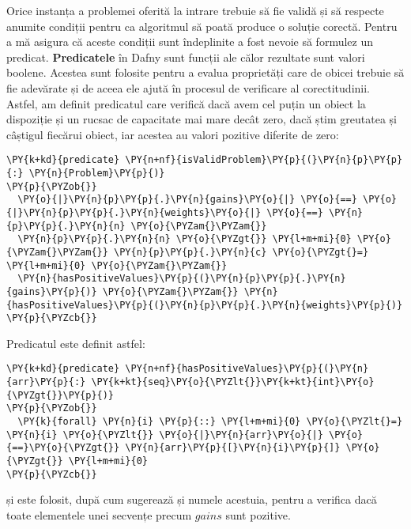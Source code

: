\begin{sloppypar}
Orice instanța a problemei oferită la intrare trebuie să fie validă și să respecte anumite condiții pentru ca algoritmul să poată produce o soluție corectă. Pentru a mă asigura că aceste condiții sunt îndeplinite a fost nevoie să formulez un predicat. \textbf{Predicatele} în Dafny sunt funcții ale călor rezultate sunt valori boolene. Acestea sunt folosite pentru a evalua proprietăți care de obicei trebuie să fie adevărate și de aceea ele ajută în procesul de verificare al corectitudinii. Astfel, am definit predicatul  care verifică dacă avem cel puțin un obiect la dispoziție și un rucsac de capacitate mai mare decât zero, dacă știm greutatea și câștigul fiecărui obiect, iar acestea au valori pozitive diferite de zero:
    \begin{Verbatim}[commandchars=\\\{\}]
\PY{k+kd}{predicate} \PY{n+nf}{isValidProblem}\PY{p}{(}\PY{n}{p}\PY{p}{:} \PY{n}{Problem}\PY{p}{)}
\PY{p}{\PYZob{}}
  \PY{o}{|}\PY{n}{p}\PY{p}{.}\PY{n}{gains}\PY{o}{|} \PY{o}{==} \PY{o}{|}\PY{n}{p}\PY{p}{.}\PY{n}{weights}\PY{o}{|} \PY{o}{==} \PY{n}{p}\PY{p}{.}\PY{n}{n} \PY{o}{\PYZam{}\PYZam{}} 
  \PY{n}{p}\PY{p}{.}\PY{n}{n} \PY{o}{\PYZgt{}} \PY{l+m+mi}{0} \PY{o}{\PYZam{}\PYZam{}} \PY{n}{p}\PY{p}{.}\PY{n}{c} \PY{o}{\PYZgt{}=} \PY{l+m+mi}{0} \PY{o}{\PYZam{}\PYZam{}} 
  \PY{n}{hasPositiveValues}\PY{p}{(}\PY{n}{p}\PY{p}{.}\PY{n}{gains}\PY{p}{)} \PY{o}{\PYZam{}\PYZam{}} \PY{n}{hasPositiveValues}\PY{p}{(}\PY{n}{p}\PY{p}{.}\PY{n}{weights}\PY{p}{)} 
\PY{p}{\PYZcb{}}
\end{Verbatim}
\par Predicatul  este definit astfel:
    \begin{Verbatim}[commandchars=\\\{\}]
\PY{k+kd}{predicate} \PY{n+nf}{hasPositiveValues}\PY{p}{(}\PY{n}{arr}\PY{p}{:} \PY{k+kt}{seq}\PY{o}{\PYZlt{}}\PY{k+kt}{int}\PY{o}{\PYZgt{}}\PY{p}{)}
\PY{p}{\PYZob{}}
  \PY{k}{forall} \PY{n}{i} \PY{p}{::} \PY{l+m+mi}{0} \PY{o}{\PYZlt{}=} \PY{n}{i} \PY{o}{\PYZlt{}} \PY{o}{|}\PY{n}{arr}\PY{o}{|} \PY{o}{==}\PY{o}{\PYZgt{}} \PY{n}{arr}\PY{p}{[}\PY{n}{i}\PY{p}{]} \PY{o}{\PYZgt{}} \PY{l+m+mi}{0}
\PY{p}{\PYZcb{}}
\end{Verbatim}
    și este folosit, după cum sugerează și numele acestuia, pentru a verifica dacă toate elementele unei secvențe precum $gains$ sunt pozitive. \\ \par 


\end{sloppypar}
